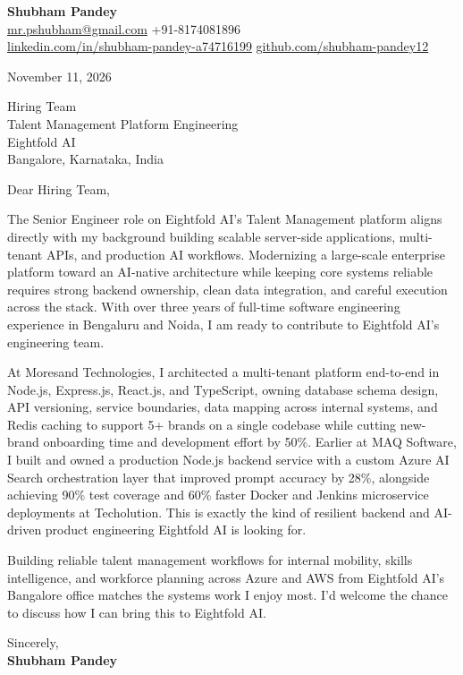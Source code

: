 \documentclass[a4paper,11pt]{article}
\begin{document}
\textbf{\Large Shubham Pandey}\\
\href{mailto:mr.pshubham@gmail.com}{mr.pshubham@gmail.com} \quad +91-8174081896\\
\href{https://www.linkedin.com/in/shubham-pandey-a74716199/}{linkedin.com/in/shubham-pandey-a74716199} \quad
\href{https://github.com/shubham-pandey12}{github.com/shubham-pandey12}

\vspace{1em}
November 11, 2026

\vspace{1em}
Hiring Team\\
Talent Management Platform Engineering\\
Eightfold AI\\
Bangalore, Karnataka, India

\vspace{1em}
Dear Hiring Team,

The Senior Engineer role on Eightfold AI's Talent Management platform aligns directly with my background building scalable server-side applications, multi-tenant APIs, and production AI workflows. Modernizing a large-scale enterprise platform toward an AI-native architecture while keeping core systems reliable requires strong backend ownership, clean data integration, and careful execution across the stack. With over three years of full-time software engineering experience in Bengaluru and Noida, I am ready to contribute to Eightfold AI's engineering team.

At Moresand Technologies, I architected a multi-tenant platform end-to-end in Node.js, Express.js, React.js, and TypeScript, owning database schema design, API versioning, service boundaries, data mapping across internal systems, and Redis caching to support 5+ brands on a single codebase while cutting new-brand onboarding time and development effort by 50\%. Earlier at MAQ Software, I built and owned a production Node.js backend service with a custom Azure AI Search orchestration layer that improved prompt accuracy by 28\%, alongside achieving 90\% test coverage and 60\% faster Docker and Jenkins microservice deployments at Techolution. This is exactly the kind of resilient backend and AI-driven product engineering Eightfold AI is looking for.

Building reliable talent management workflows for internal mobility, skills intelligence, and workforce planning across Azure and AWS from Eightfold AI's Bangalore office matches the systems work I enjoy most. I'd welcome the chance to discuss how I can bring this to Eightfold AI.

\vspace{1em}
Sincerely,\\[0.5em]
\textbf{Shubham Pandey}
\end{document}
